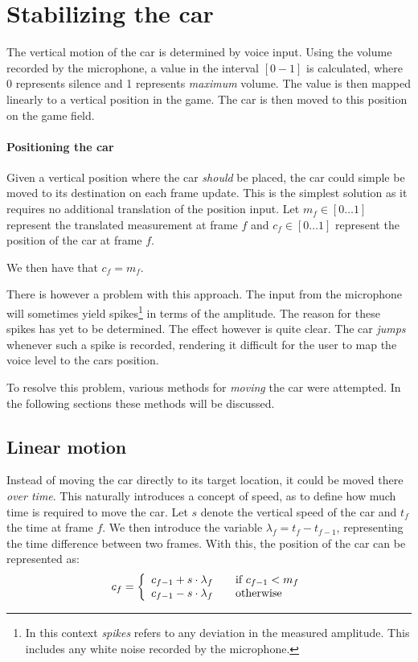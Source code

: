 \section{Stabilizing the car}\label{sprint3:stabil_car}
The vertical motion of the car is determined by voice input.
Using the volume recorded by the microphone, a value in the interval $[0-1]$ is calculated, where 0 represents silence and 1 represents \textit{maximum} volume.
The value is then mapped linearly to a vertical position in the game.
The car is then moved to this position on the game field.

\paragraph{Positioning the car}
Given a vertical position where the car \textit{should} be placed, the car could simple be moved to its destination on each frame update.
This is the simplest solution as it requires no additional translation of the position input.
Let $m_f \in [0 \dots 1]$ represent the translated measurement at frame $f$ and $c_f \in [0 \dots 1]$ represent the position of the car at frame $f$.

\begin{center}
We then have that $c_f = m_f$.
\end{center}

There is however a problem with this approach.
The input from the microphone will sometimes yield spikes\footnote{
In this context \textit{spikes} refers to any deviation in the measured amplitude.
This includes any white noise recorded by the microphone.} in terms of the amplitude.
The reason for these spikes has yet to be determined.
The effect however is quite clear.
The car \textit{jumps} whenever such a spike is recorded, rendering it difficult for the user to map the voice level to the cars position.

To resolve this problem, various methods for \textit{moving} the car were attempted.
In the following sections these methods will be discussed.

\subsection{Linear motion}\label{stability:linear}
Instead of moving the car directly to its target location, it could be moved there \textit{over time}.
This naturally introduces a concept of speed, as to define how much time is required to move the car.
Let $s$ denote the vertical speed of the car and $t_f$ the time at frame $f$.
We then introduce the variable $\lambda_f = t_f - t_{f-1}$, representing the time difference between two frames.
With this, the position of the car can be represented as: $$c_f = \left\{ 
  \begin{array}{l l}
    c_{f-1} + s \cdot \lambda_f & \quad \text{if $c_{f-1} < m_f$}\\
    c_{f-1} - s \cdot \lambda_f & \quad \text{otherwise}
  \end{array} \right.$$

